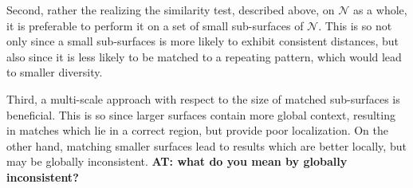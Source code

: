 \documentclass[10pt,twocolumn,letterpaper]{article}
\newcommand{\colornote}[3]{{\color{#1}\bf{#2: #3}\normalfont}}
\newcommand{\colornote}[3]{}
\newcommand {\ayellet}[1]{\colornote{blue}{AT}{#1}}
\begin{document}
Second, rather the realizing the similarity test, described above, on $\mathcal{N}$ as a whole, it is preferable to perform it on a set of small sub-surfaces of $\mathcal{N}$.
This is so not only since a small sub-surfaces is more likely to exhibit consistent distances, but also since it is less likely to be matched to a repeating pattern, which would lead to smaller diversity.

Third, a multi-scale approach with respect to the size of matched sub-surfaces is beneficial.
This is so since larger surfaces contain more global context, resulting in matches which lie in a correct region, but provide poor localization. 
On the other hand, matching smaller surfaces lead to results which are better locally, but may be globally inconsistent. \ayellet {what do you mean by globally inconsistent?}
\end{document}

